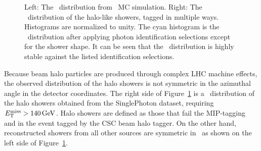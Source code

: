 \begin{figure}[htbp]
  \centering
  \caption{
    Left: The \phig\ distribution from \zinvg\ MC simulation. \qquad \qquad
    Right: The \phig\ distribution of the halo-like showers, tagged in multiple ways. 
    Histograms are normalized to unity.
    The cyan histogram is the \phig\ distribution after applying photon identification selections except for the shower shape. 
    It can be seen that the \phig\ distribution is highly stable against the listed identification selections.
  }
  \label{fig:halophi}
\end{figure}

Because beam halo particles are produced through complex LHC machine effects, the observed distribution of the halo showers is not
symmetric in the azimuthal angle in the detector coordinates.
The right side of Figure~\ref{fig:halophi} is a \phig\ distribution of the halo showers obtained from the SinglePhoton dataset, requiring $E_{\mathrm{T}}^{\text{miss}} > 140\,\text{Ge\hspace{-.08em}V}$. 
Halo showers are defined as those that fail the MIP-tagging and in the
event tagged by the CSC beam halo tagger. 
On the other hand, reconstructed showers from all other sources are symmetric in \phig\, as shown on the left side of Figure~\ref{fig:halophi}. 

